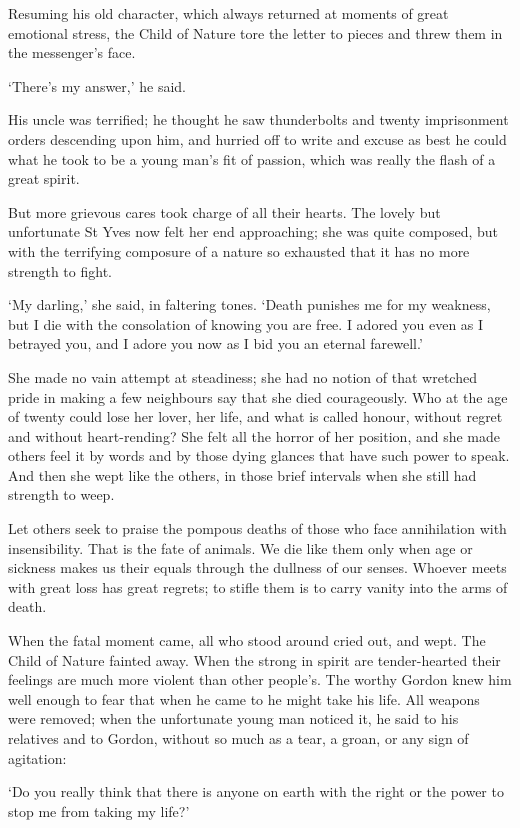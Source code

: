 \documentclass{article}
\begin{document}
\begin{center}
Resuming his old character, which always returned at moments of great emotional 
stress, the Child of Nature tore the letter to pieces and threw them in the messenger's 
face. 

`There's my answer,' he said. 

His uncle was terrified; he thought he saw thunderbolts and twenty imprisonment 
orders descending upon him, and hurried off to write and excuse as best he could 
what he took to be a young man's fit of passion, which was really the flash of 
a great spirit. 

But more grievous cares took charge of all their hearts. The lovely but unfortunate 
St Yves now felt her end approaching; she was quite composed, but with the terrifying 
composure of a nature so exhausted that it has no more strength to fight. 

`My darling,' she said, in faltering tones. `Death punishes me for my weakness, 
but I die with the consolation of knowing you are free. I adored you even as I 
betrayed you, and I adore you now as I bid you an eternal farewell.' 

She made no vain attempt at steadiness; she had no notion of that wretched pride 
in making a few neighbours say that she died courageously. Who at the age of twenty 
could lose her lover, her life, and what is called honour, without regret and without 
heart-rending? She felt all the horror of her position, and she made others feel 
it by words and by those dying glances that have such power to speak. And then 
she wept like the others, in those brief intervals when she still had strength 
to weep. 

Let others seek to praise the pompous deaths of those who face annihilation with 
insensibility. That is the fate of animals. We die like them only when age or sickness 
makes us their equals through the dullness of our senses. Whoever meets with great 
loss has great regrets; to stifle them is to carry vanity into the arms of death. 

When the fatal moment came, all who stood around cried out, and wept. The Child 
of Nature fainted away. When the strong in spirit are tender-hearted their feelings 
are much more violent than other people's. The worthy Gordon knew him well enough 
to fear that when he came to he might take his life. All weapons were removed; 
when the unfortunate young man noticed it, he said to his relatives and to Gordon, 
without so much as a tear, a groan, or any sign of agitation: 

`Do you really think that there is anyone on earth with the right or the power 
to stop me from taking my life?' 


\end{center}
\end{document}

